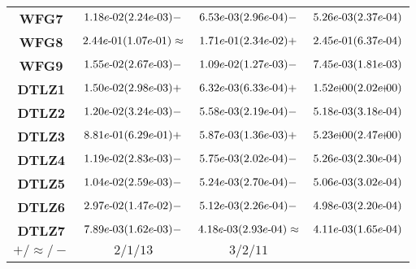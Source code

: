 \documentclass{article}
\begin{document}
\begin{table}[!htp]
\begin{tiny}
\begin{tabular}{c|ccc}
\textbf{WFG7} & ${1.18e\makebox[0.1cm]{-}02(2.24e\makebox[0.1cm]{-}03)-} $ & $ \cellcolor{gray25} {6.53e\makebox[0.1cm]{-}03(2.96e\makebox[0.1cm]{-}04)-} $ & $ \cellcolor{gray95} 5.26e\makebox[0.1cm]{-}03(2.37e\makebox[0.1cm]{-}04)$ \\
\textbf{WFG8} & $\cellcolor{gray25} {2.44e\makebox[0.1cm]{-}01(1.07e\makebox[0.1cm]{-}01)\approx} $ & $ \cellcolor{gray95} {1.71e\makebox[0.1cm]{-}01(2.34e\makebox[0.1cm]{-}02)+} $ & $ 2.45e\makebox[0.1cm]{-}01(6.37e\makebox[0.1cm]{-}04)$ \\
\textbf{WFG9} & ${1.55e\makebox[0.1cm]{-}02(2.67e\makebox[0.1cm]{-}03)-} $ & $ \cellcolor{gray25} {1.09e\makebox[0.1cm]{-}02(1.27e\makebox[0.1cm]{-}03)-} $ & $ \cellcolor{gray95} 7.45e\makebox[0.1cm]{-}03(1.81e\makebox[0.1cm]{-}03)$ \\
\textbf{DTLZ1} & $\cellcolor{gray25} {1.50e\makebox[0.1cm]{-}02(2.98e\makebox[0.1cm]{-}03)+} $ & $ \cellcolor{gray95} {6.32e\makebox[0.1cm]{-}03(6.33e\makebox[0.1cm]{-}04)+} $ & $ 1.52e\makebox[0.1cm]{+}00(2.02e\makebox[0.1cm]{+}00)$ \\
\textbf{DTLZ2} & ${1.20e\makebox[0.1cm]{-}02(3.24e\makebox[0.1cm]{-}03)-} $ & $ \cellcolor{gray25} {5.58e\makebox[0.1cm]{-}03(2.19e\makebox[0.1cm]{-}04)-} $ & $ \cellcolor{gray95} 5.18e\makebox[0.1cm]{-}03(3.18e\makebox[0.1cm]{-}04)$ \\
\textbf{DTLZ3} & $\cellcolor{gray25} {8.81e\makebox[0.1cm]{-}01(6.29e\makebox[0.1cm]{-}01)+} $ & $ \cellcolor{gray95} {5.87e\makebox[0.1cm]{-}03(1.36e\makebox[0.1cm]{-}03)+} $ & $ 5.23e\makebox[0.1cm]{+}00(2.47e\makebox[0.1cm]{+}00)$ \\
\textbf{DTLZ4} & ${1.19e\makebox[0.1cm]{-}02(2.83e\makebox[0.1cm]{-}03)-} $ & $ \cellcolor{gray25} {5.75e\makebox[0.1cm]{-}03(2.02e\makebox[0.1cm]{-}04)-} $ & $ \cellcolor{gray95} 5.26e\makebox[0.1cm]{-}03(2.30e\makebox[0.1cm]{-}04)$ \\
\textbf{DTLZ5} & ${1.04e\makebox[0.1cm]{-}02(2.59e\makebox[0.1cm]{-}03)-} $ & $ \cellcolor{gray25} {5.24e\makebox[0.1cm]{-}03(2.70e\makebox[0.1cm]{-}04)-} $ & $ \cellcolor{gray95} 5.06e\makebox[0.1cm]{-}03(3.02e\makebox[0.1cm]{-}04)$ \\
\textbf{DTLZ6} & ${2.97e\makebox[0.1cm]{-}02(1.47e\makebox[0.1cm]{-}02)-} $ & $ \cellcolor{gray25} {5.12e\makebox[0.1cm]{-}03(2.26e\makebox[0.1cm]{-}04)-} $ & $ \cellcolor{gray95} 4.98e\makebox[0.1cm]{-}03(2.20e\makebox[0.1cm]{-}04)$ \\
\textbf{DTLZ7} & ${7.89e\makebox[0.1cm]{-}03(1.62e\makebox[0.1cm]{-}03)-} $ & $ \cellcolor{gray25} {4.18e\makebox[0.1cm]{-}03(2.93e\makebox[0.1cm]{-}04)\approx} $ & $ \cellcolor{gray95} 4.11e\makebox[0.1cm]{-}03(1.65e\makebox[0.1cm]{-}04)$ \\
  \hline
\textbf{$+/\approx/-$} & $2/1/13 $ & $ 3/2/11$ \\
  \end{tabular}
  \end{tiny}
\end{table}
\end{document}
